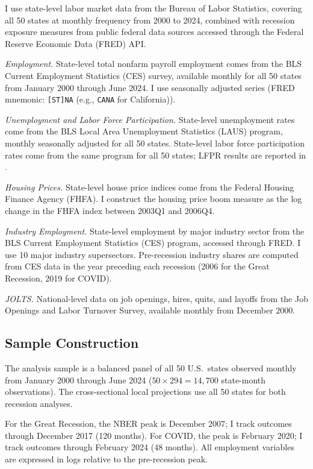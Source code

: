 \documentclass[12pt]{article}
\begin{document}
I use state-level labor market data from the Bureau of Labor Statistics, covering all 50 states at monthly frequency from 2000 to 2024, combined with recession exposure measures from public federal data sources accessed through the Federal Reserve Economic Data (FRED) API.

\textit{Employment.} State-level total nonfarm payroll employment comes from the BLS Current Employment Statistics (CES) survey, available monthly for all 50 states from January 2000 through June 2024. I use seasonally adjusted series (FRED mnemonic: \texttt{[ST]NA} (e.g., \texttt{CANA} for California)).

\textit{Unemployment and Labor Force Participation.} State-level unemployment rates come from the BLS Local Area Unemployment Statistics (LAUS) program, monthly seasonally adjusted for all 50 states. State-level labor force participation rates come from the same program for all 50 states; LFPR results are reported in .

\textit{Housing Prices.} State-level house price indices come from the Federal Housing Finance Agency (FHFA). I construct the housing price boom measure as the log change in the FHFA index between 2003Q1 and 2006Q4.

\textit{Industry Employment.} State-level employment by major industry sector from the BLS Current Employment Statistics (CES) program, accessed through FRED. I use 10 major industry supersectors. Pre-recession industry shares are computed from CES data in the year preceding each recession (2006 for the Great Recession, 2019 for COVID).

\textit{JOLTS.} National-level data on job openings, hires, quits, and layoffs from the Job Openings and Labor Turnover Survey, available monthly from December 2000.

\subsection{Sample Construction}

The analysis sample is a balanced panel of all 50 U.S.\ states observed monthly from January 2000 through June 2024 ($50 \times 294 = 14{,}700$ state-month observations). The cross-sectional local projections use all 50 states for both recession analyses.

For the Great Recession, the NBER peak is December 2007; I track outcomes through December 2017 (120 months). For COVID, the peak is February 2020; I track outcomes through February 2024 (48 months). All employment variables are expressed in logs relative to the pre-recession peak.
\end{document}
